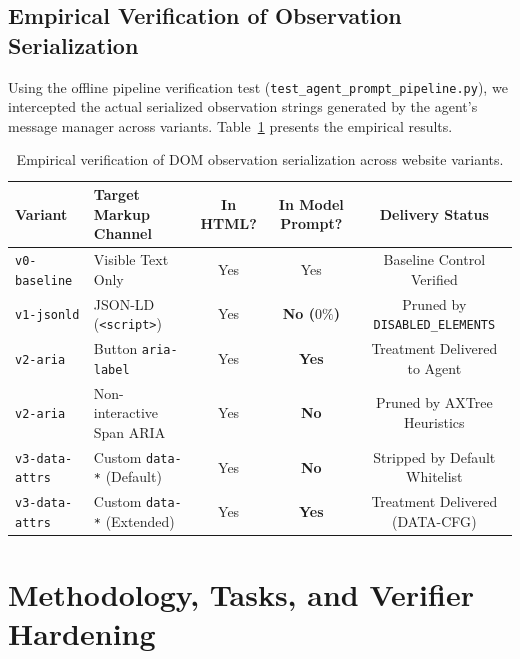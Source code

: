 \documentclass[11pt,a4paper]{article}
\begin{document}
\subsection{Empirical Verification of Observation Serialization}
Using the offline pipeline verification test (\texttt{test\_agent\_prompt\_pipeline.py}), we intercepted the actual serialized observation strings generated by the agent's message manager across variants. Table~\ref{tab:pipeline_trace} presents the empirical results.

\begin{table}[t]
\centering
\small
\caption{Empirical verification of DOM observation serialization across website variants.}
\label{tab:pipeline_trace}
\begin{tabular}{llccc}
\toprule
\textbf{Variant} & \textbf{Target Markup Channel} & \textbf{In HTML?} & \textbf{In Model Prompt?} & \textbf{Delivery Status} \\
\midrule
\texttt{v0-baseline} & Visible Text Only & Yes & Yes & Baseline Control Verified \\
\texttt{v1-jsonld}   & JSON-LD (\texttt{<script>}) & Yes & \textbf{No ($0\%$)} & Pruned by \texttt{DISABLED\_ELEMENTS} \\
\texttt{v2-aria}     & Button \texttt{aria-label} & Yes & \textbf{Yes} & Treatment Delivered to Agent \\
\texttt{v2-aria}     & Non-interactive Span ARIA & Yes & \textbf{No} & Pruned by AXTree Heuristics \\
\texttt{v3-data-attrs}& Custom \texttt{data-*} (Default) & Yes & \textbf{No} & Stripped by Default Whitelist \\
\texttt{v3-data-attrs}& Custom \texttt{data-*} (Extended)& Yes & \textbf{Yes} & Treatment Delivered (\textsc{DATA-CFG}) \\
\bottomrule
\end{tabular}
\end{table}

\section{Methodology, Tasks, and Verifier Hardening}
\label{sec:methodology}
\end{document}
